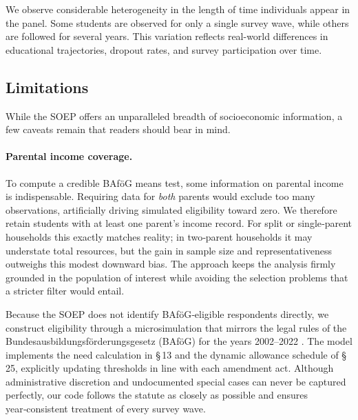 We observe considerable heterogeneity in the length of time individuals appear in the panel. Some students are observed for only a single survey wave, while others are followed for several years. This variation reflects real-world differences in educational trajectories, dropout rates, and survey participation over time.

\subsection{Limitations}

While the SOEP offers an unparalleled breadth of socioeconomic information, a few caveats remain that readers should bear in mind.

\paragraph{Parental income coverage.}
To compute a credible BAföG means test, some information on parental income is indispensable.  Requiring data for \emph{both} parents would exclude too many observations, artificially driving simulated eligibility toward zero.  We therefore retain students with at least one parent’s income record.  For split or single‑parent households this exactly matches reality; in two‑parent households it may understate total resources, but the gain in sample size and representativeness outweighs this modest downward bias.  The approach keeps the analysis firmly grounded in the population of interest while avoiding the selection problems that a stricter filter would entail.

Because the SOEP does not identify BAföG‑eligible respondents directly, we construct eligibility through a microsimulation that mirrors the legal rules of the Bundesausbildungsförderungsgesetz (BAföG) for the years 2002–2022 \citep{bafoeg_law,bafoeg20,bafoeg21,bafoeg22,bafoeg23,bafoeg24,bafoeg25,bafoeg26,bafoeg27,bafoeg28,bafoeg29}.  The model implements the need calculation in §\,13 and the dynamic allowance schedule of §\,25, explicitly updating thresholds in line with each amendment act.  Although administrative discretion and undocumented special cases can never be captured perfectly, our code follows the statute as closely as possible and ensures year‑consistent treatment of every survey wave.

